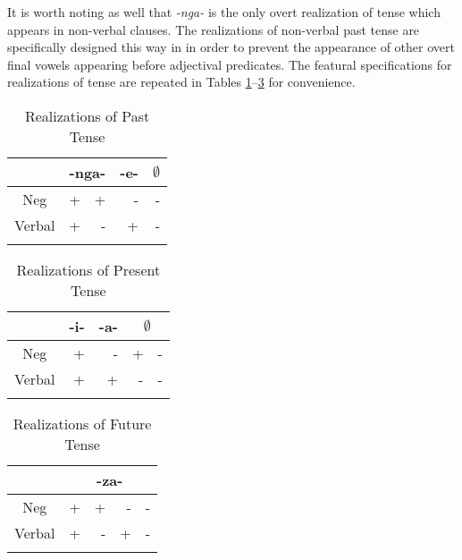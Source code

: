 \documentclass[output=paper]{langsci/langscibook}
\newcommand{\nga}[0]{\textit{-nga- }}
\begin{document}
It is worth noting as well that \nga is the only overt realization of tense which appears in non-verbal clauses. The realizations of non-verbal past tense are specifically designed this way in  in order to prevent the appearance of other overt final vowels appearing before adjectival predicates. The featural specifications for realizations of tense are repeated in Tables \ref{tab:burkholder:6}--\ref{tab:burkholder:8} for convenience. 


\begin{table}
\caption{Realizations of Past Tense} %
\centering %
\begin{tabular}{c| rr|r|r} %
\lsptoprule%
 &\multicolumn{2}{c}{-nga-}& \multicolumn{1}{|c}{-e-}& \multicolumn{1}{|c}{$\emptyset$} \\ [0.5ex] 
\midrule%
Neg & + & + & - & -\\ %
Verbal & + & - & +& -\\[1ex] %
\lspbottomrule%
\end{tabular} 
\label{tab:burkholder:6}
\end{table} 





\begin{table}
\caption{Realizations of Present Tense} %
\centering %
\begin{tabular}{c| r|r|rr} %
\lsptoprule%
 &\multicolumn{1}{c}{-i-}& \multicolumn{1}{|c|}{-a-}& \multicolumn{2}{|c}{$\emptyset$} \\ [0.5ex] 
\midrule%
Neg & + & - & + & -\\ %
Verbal & + & + & -& -\\[1ex] %
\lspbottomrule%
\end{tabular} 
\label{tab:burkholder:7}
\end{table} 



\begin{table}
\caption{Realizations of Future Tense} %
\centering %
\begin{tabular}{c| rrrr} %
\lsptoprule%
 &\multicolumn{4}{c}{-za-} \\ [0.5ex] 
\midrule%
Neg & + & + & - & -\\ %
Verbal & + & - & +& -\\[1ex] %
\lspbottomrule%
\end{tabular} 
\label{tab:burkholder:8}
\end{table} 
\end{document}
